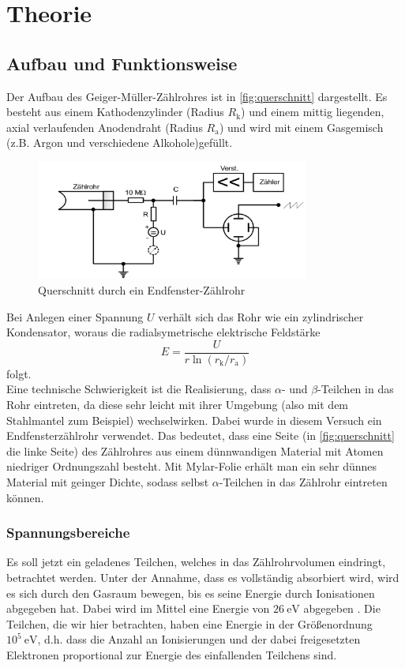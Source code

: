 \section{Theorie}
\label{sec:Theorie}

\subsection{Aufbau und Funktionsweise}
\label{sec:aufbau}

Der Aufbau des Geiger-Müller-Zählrohres ist in \autoref{fig:querschnitt} dargestellt. Es besteht aus
einem Kathodenzylinder (Radius $R_\text{k}$) und einem mittig liegenden, axial verlaufenden
Anodendraht (Radius $R_\text{a}$) und wird mit einem Gasgemisch (z.B. Argon und verschiedene Alkohole)gefüllt.
\begin{figure}[H]
	\centering
	\includegraphics[width=0.8\textwidth]{content/aufbau.png}
	\caption{Querschnitt durch ein Endfenster-Zählrohr \cite{sample}}
	\label{fig:querschnitt}
\end{figure}
\noindent
Bei Anlegen einer Spannung $U$ verhält sich das Rohr wie ein zylindrischer Kondensator, woraus die 
radialsymetrische elektrische Feldstärke
\begin{equation}
	E = \frac{U}{r \ln(r_\text{k} / r_\text{a})}
	\label{eqn:elektrisches-feld}
\end{equation}
folgt.
\\
Eine technische Schwierigkeit ist die Realisierung, dass $\alpha$- und
$\beta$-Teilchen in das Rohr eintreten, da diese sehr leicht mit ihrer Umgebung (also mit dem Stahlmantel zum Beispiel)
wechselwirken. Dabei wurde in diesem
Versuch ein Endfensterzählrohr verwendet. Das bedeutet, dass eine Seite (in \autoref{fig:querschnitt} die linke
Seite) des Zählrohres aus einem dünnwandigen Material mit Atomen niedriger Ordnungszahl besteht. Mit Mylar-Folie 
erhält man ein sehr dünnes Material mit geinger Dichte, sodass selbst $\alpha$-Teilchen in das Zählrohr eintreten 
können.

\subsubsection{Spannungsbereiche}
Es soll jetzt ein geladenes Teilchen, welches in das Zählrohrvolumen eindringt, betrachtet werden. Unter
der Annahme, dass es vollständig absorbiert wird, wird es sich durch den Gasraum bewegen, bis es seine 
Energie durch Ionisationen abgegeben hat. Dabei wird im Mittel eine Energie von $26\ \si{\eV}$ 
abgegeben \cite{detektoren}.
Die Teilchen, die wir hier betrachten, haben eine Energie in der Größenordnung $10^5\ \si{\eV}$, d.h. 
dass die Anzahl an Ionisierungen und der dabei freigesetzten Elektronen proportional zur Energie des 
einfallenden Teilchens sind.

